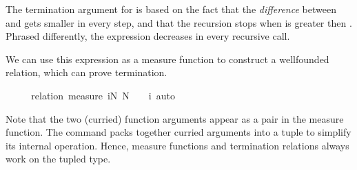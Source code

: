 \begin{isabellebody}
\begin{isamarkuptext}
  The termination argument for  is based on the fact that
  the \emph{difference} between  and  gets
  smaller in every step, and that the recursion stops when 
  is greater then . Phrased differently, the expression 
   decreases in every recursive call.

  We can use this expression as a measure function to construct a
  wellfounded relation, which can prove termination.%
\end{isamarkuptext}%
\isamarkuptrue%
\isamarkupfalse%
\ \isanewline
%
\isadelimproof
\ \ %
\endisadelimproof
%
\isatagproof
{}\isamarkupfalse%
\ {\isacharparenleft}relation\ {\isachardoublequoteopen}measure\ {\isacharparenleft}{\isasymlambda}{\isacharparenleft}i{\isacharcomma}N{\isacharparenright}{\isachardot}\ N\ {\isacharplus}\ {}\ {\isacharminus}\ i{\isacharparenright}{\isachardoublequoteclose}{\isacharparenright}\ auto%
\endisatagproof
{\isafoldproof}%
%
\isadelimproof
%
\endisadelimproof
%
\begin{isamarkuptext}%
Note that the two (curried) function arguments appear as a pair in
  the measure function. The  command packs together curried
  arguments into a tuple to simplify its internal operation. Hence,
  measure functions and termination relations always work on the
  tupled type.


\end{isamarkuptext}
\end{isabellebody}

